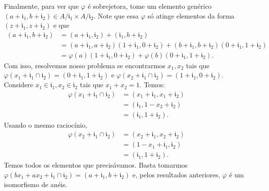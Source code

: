 \documentclass[algebraII_notes.tex]{subfiles}
\begin{document}
\begin{proof*}
	Finalmente, para ver que \(\varphi \) é sobrejetora, tome um elemento genérico \((a+\mathfrak{i}_{1}, b+\mathfrak{i}_{2})\in A/\mathfrak{i}_{1}\times A/\mathfrak{i}_{2}.\)
	Note que essa \(\varphi \) só atinge elementos da forma \((z + \mathfrak{i}_{1}, z + \mathfrak{i}_{2})\) e que
	\begin{align*}
		(a+\mathfrak{i}_{1}, b+\mathfrak{i}_{2}) & = (a+\mathfrak{i}_{1}, \mathfrak{i}_{2}) + (\mathfrak{i}_{1}, b + \mathfrak{i}_{2})                                                                                         \\
		                                         & = (a+\mathfrak{i}_{1}, a + \mathfrak{i}_{2})(1+\mathfrak{i}_{1}, 0 + \mathfrak{i}_{2}) + (b+\mathfrak{i}_{1}, b+\mathfrak{i}_{2})(0+\mathfrak{i}_{1}, 1 + \mathfrak{i}_{2}) \\
		                                         & = \varphi(a)(1+\mathfrak{i}_{1}, 0 + \mathfrak{i}_{2}) + \varphi(b)(0+\mathfrak{i}_{1}, 1 + \mathfrak{i}_{2}).
	\end{align*}
	Com isso, resolvemos nosso problema se encontrarmos \(x_{1}, x_{2}\) tais que \(\varphi (x_{1}+\mathfrak{i}_{1}\cap \mathfrak{i}_{2}) = (0 +\mathfrak{i}_{1}, 1 +\mathfrak{i}_{2})\) e
	\(\varphi (x_{2} + \mathfrak{i}_{1}\cap \mathfrak{i}_{2}) = (1+\mathfrak{i}_{1}, 0+\mathfrak{i}_{2}).\) Considere
	\(x_{1}\in \mathfrak{i}_{1}, x_{2}\in \mathfrak{i}_{2}\) tais que \(x_{1} + x_{2} = 1.\) Temos:
	\begin{align*}
		\varphi (x_{1}+\mathfrak{i}_{1}\cap \mathfrak{i}_{2}) & = (x_{1}+\mathfrak{i}_{1}, x_{1}+\mathfrak{i}_{2}) \\
		                                                      & = (\mathfrak{i}_{1}, 1 - x_{2} + \mathfrak{i}_{2}) \\
		                                                      & = (\mathfrak{i}_{1}, 1+\mathfrak{i}_{2}).
	\end{align*}
	Usando o mesmo raciocínio,
	\begin{align*}
		\varphi (x_{2} + \mathfrak{i}_{1}\cap \mathfrak{i}_{2}) & = (x_{2}+\mathfrak{i}_{1}, x_{2}+\mathfrak{i}_{2}) \\
		                                                        & = (1-x_{1}+\mathfrak{i}_{1}, \mathfrak{i}_{2})     \\
		                                                        & = (\mathfrak{i}_{1}, 1 + \mathfrak{i}_{2}).
	\end{align*}
	Temos todos os elementos que precisávamos. Basta tomarmos \(\varphi (bx_{1} + ax_{2} + \mathfrak{i}_{1}\cap \mathfrak{i}_{2}) = (a+\mathfrak{i}_{1}, b+\mathfrak{i}_{2})\) e, pelos resultados anteriores,
	\(\varphi \) é um isomorfismo de anéis.


\end{proof*}
\end{document}

